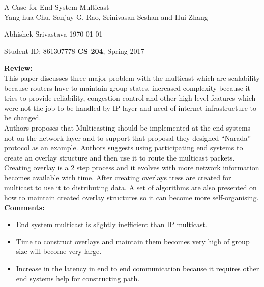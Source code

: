 \documentclass[a4paper,12pt, twoside]{article}
\renewcommand{\maketitle}{%
 	\Large
 	\begin{center}
 	A Case for End System Multicast\\	
 	\normalsize Yang-hua Chu, Sanjay G. Rao, Srinivasan Seshan and Hui Zhang
 	\end{center}
 
 	\Large
	Abhishek Srivastava
	\hfill
	\normalsize
	\today
 	\par
 	Student ID: 861307778
 	\hfill
 	\textbf{CS 204}, Spring 2017
 	\par 	
 	\hrulefill
 	\par
 	}
\begin{document}
\thispagestyle{empty}
	
\maketitle

\textbf{Review:}\\
This paper discusses three major problem with the multicast which are scalability because routers have to maintain group states, increased complexity because it tries to provide reliability, congestion control and other high level features which were not the job to be handled by IP layer and need of internet infrastructure to be changed. \\


Authors proposes that Multicasting should be implemented at the end systems not on the network layer and to support that proposal they designed ``Narada'' protocol as an example. Authors suggests using participating end systems to create an overlay structure and then use it to route the multicast packets. Creating overlay is a 2 step process and it evolves with more network information becomes available with time. After creating overlays tress are created for multicast to use it to distributing data. A set of algorithms are also presented on how to maintain created overlay structures so it can become more self-organising. \\ 


\textbf{Comments:}
\begin{itemize}
	\item End system multicast is slightly inefficient than IP multicast.
	\item Time to construct overlays and maintain them becomes very high of group size will become very large.
	\item Increase in the latency in end to end communication because it requires other end systems help for constructing path.
\end{itemize}
\end{document}
